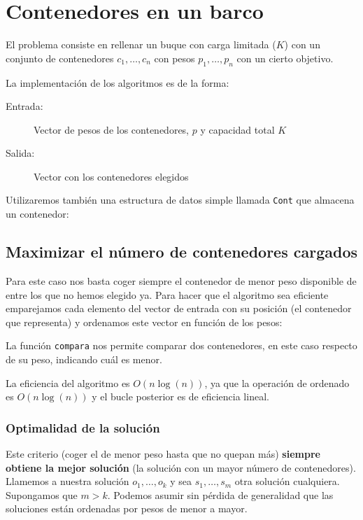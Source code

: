 
\section{Contenedores en un barco}

El problema consiste en rellenar un buque con carga limitada ($K$) con un conjunto
de contenedores $c_1,\dots, c_n$ con pesos $p_1, \dots, p_n$ con un cierto objetivo.

La implementación de los algoritmos es de la forma:
\begin{description}
 \item[Entrada:] Vector de pesos de los contenedores, $p$ y capacidad total $K$
 \item[Salida:] Vector con los contenedores elegidos
\end{description}

Utilizaremos también una estructura de datos simple llamada \texttt{Cont} que almacena un
contenedor:



\subsection{Maximizar el número de contenedores cargados}

Para este caso nos basta coger siempre el contenedor de menor peso disponible de entre los
que no hemos elegido ya.
Para hacer que el algoritmo sea eficiente emparejamos cada elemento
del vector de entrada con su posición (el contenedor que representa)
y ordenamos este vector en función de los pesos:



La función \texttt{compara} nos permite comparar dos contenedores, en este caso respecto de su peso, indicando cuál es menor.

La eficiencia del algoritmo es $O(n\log(n))$, ya que la operación de ordenado es
$O(n\log(n))$ y el bucle posterior es de eficiencia lineal.

\newpage

\subsubsection{Optimalidad de la solución}

Este criterio (coger el de menor peso hasta que no quepan más) \textbf{siempre obtiene la
mejor solución} (la solución con un mayor número de contenedores).
Llamemos a nuestra solución $o_1, \dots, o_k$ y sea $s_1, \dots, s_m$ otra solución
cualquiera. Supongamos que $m > k$. Podemos asumir sin pérdida de generalidad que las
soluciones están ordenadas por pesos de menor a mayor.

